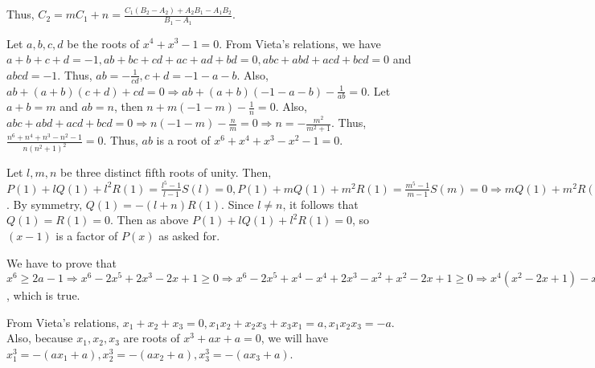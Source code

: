   Thus, $C_2 = mC_1 + n = \frac{C_1(B_2 - A_2) + A_2B_1 - A_1B_2}{B_1 - A_1}$.
\item Let $a, b, c, d$ be the roots of $x^4 + x^3 - 1 = 0$. From Vieta's relations, we have $a + b + c + d =
  -1, ab + bc + cd + ac + ad + bd = 0, abc + abd + acd + bcd = 0$ and $abcd = -1$. Thus, $ab =
  -\frac{1}{cd}, c + d = -1 - a - b$. Also, $ab + (a + b)(c + d) + cd = 0 \Rightarrow ab + (a + b)(-1 - a -
  b) - \frac{1}{ab} = 0$. Let $a + b = m$ and $ab = n$, then $n + m(-1 -m) - \frac{1}{n} = 0$. Also, $abc +
  abd + acd + bcd = 0\Rightarrow n(- 1 - m) - \frac{n}{m} = 0\Rightarrow n = -\frac{m^2}{m^2 + 1}$. Thus,
  $\frac{n^6 + n^4 + n^3 - n^2 - 1}{n(n^2 + 1)^2} = 0$. Thus, $ab$ is a root of $x^6 + x^4 + x^3 - x^2 - 1 =
  0$.
\item Let $l, m, n$ be three distinct fifth roots of unity. Then, $P(1) + lQ(1) + l^2R(1) = \frac{l^5 - 1}{l
- 1}S(l) = 0, P(1) + mQ(1) + m^2R(1) = \frac{m^5 - 1}{m - 1}S(m) = 0 \Rightarrow mQ(1) + m^2R(1) = nQ(1) +
  n^2R(1)\Rightarrow Q(1) = -(l + m)R(1)$. By symmetry, $Q(1) = -(l + n)R(1)$. Since $l\neq n$, it follows
  that $Q(1) = R(1) = 0$. Then as above $P(1) + lQ(1) + l^2R(1) = 0$, so $(x - 1)$ is a factor of $P(x)$ as
  asked for.
\item We have to prove that $x^6 \geq 2a - 1 \Rightarrow x^6 - 2x^5 + 2x^3 - 2x + 1\geq 0 \Rightarrow x^6
  -2x^5 + x^4 - x^4 + 2x^3 - x^2 + x^2 - 2x + 1\geq 0 \Rightarrow x^4(x^2 - 2x + 1) - x^2(x^2 - 2x + 1) +
  x^2 - 2x + 1\geq 0\Rightarrow (x^2 - 2x + 1)(x^4 - x^2 + 1)\geq 0$, which is true.
\item From Vieta's relations, $x_1 + x_2 + x_3 = 0, x_1x_2 + x_2x_3 + x_3x_1 = a, x_1x_2x_3 = -a$. Also,
  because $x_1, x_2, x_3$ are roots of $x^3 + ax + a = 0$, we will have $x_1^3 = -(ax_1 + a), x_2^3 = -(ax_2
  + a), x_3^3 = -(ax_3 + a)$.

